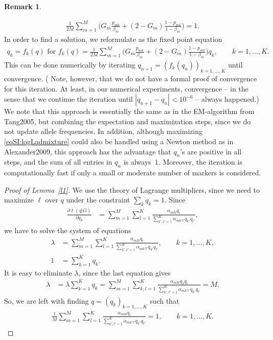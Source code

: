 \documentclass[12pt]{article}
\theoremstyle{definition}
\newtheorem{remark}{Remark}[section]
\begin{document}
\begin{remark}
\begin{enumerate}
\begin{align*}
      \frac{1}{2M} \sum_{m=1}^M \Big(G_m \frac{p_{mk}}{\beta_m} + (2-G_m)\frac{1-p_{mk}}{1-\beta_m}\Big) = 1.
    \end{align*}
    In order to find a solution, we reformulate as the fixed point
    equation
    \begin{align}\label{eqSI:fixed}
      q_k = f_k(q) \text{ for }f_k(q) =
      \frac{1}{2M} \sum_{m=1}^M \Big(G_m \frac{p_{mk}}{\beta_m} + (2-G_m)\frac{1-p_{mk}}{1-\beta_m}\Big)q_k,
      \qquad k =1,...,K.
    \end{align}
This can be done numerically by iterating
$q_{n+1} = (f_k(q_n))_{k=1,...,K}$ until convergence. ({\color{blue} Note, however, that we do not have a formal proof of convergence for this iteration. At least, in our numerical experiments, convergence  -- in the sense that we continue the iteration until $|q_{n+1} - q_n|< 10^{-6}$ -- always happened.}) We note that this approach is essentially the same as in the EM-algorithm from \cite{SI}{Tang2005}, but combining the expectation and maximization steps, since we do not update allele frequencies. In addition, although maximizing \eqref{eqSI:logLadmixture} could also be handled using a Newton method as in \cite{SI}{Alexander2009}, this approach has the advantage that $q_n$'s are positive in all steps, and the sum of all entries in $q_n$ is always~1. Moreover, the iteration is computationally fast if only a small or moderate number of {\color{blue} markers} is considered.

  \end{enumerate}
\end{remark}

\begin{proof}[Proof of Lemma~\ref{l1}]
  We use the theory of Lagrange multipliers, since we need to maximize
  $\ell$ over $q$ under the constraint $\sum_k q_k=1$.  Since
  \begin{align*}
    \frac{\partial \ell(q|G)}{\partial q_k} & = \sum_{m=1}^M \sum_{l=1}^K \frac{\alpha_{mkl}q_l}{\sum_{k',l'=1}^K
                                              \alpha_{mk'l'}q_{k'}q_{l'}},
  \end{align*}
  we have to solve the system of equations
  \begin{align*}
    \lambda & = \sum_{m=1}^M \sum_{l=1}^K \frac{\alpha_{mkl}q_l}{\sum_{k',l'=1}^K \alpha_{mk'l'}q_{k'}q_{l'}}, \qquad k=1,...,K,
    \\
    1 & = \sum_{k=1}^K q_k.
  \end{align*}
  It is easy to eliminate $\lambda$, since the last equation gives
  \begin{align*}
    \lambda & = \lambda \sum_{k=1}^K q_k = \sum_{m=1}^M \sum_{k,l=1}^K
              \frac{\alpha_{mkl}q_kq_l}{\sum_{k',l'=1}^K \alpha_{mk'l'}q_{k'}q_{l'}} = M.
  \end{align*}
  So, we are left with finding $q = (q_k)_{k=1,...,K}$ such that
  \begin{align*}
    \frac{1}{M}\sum_{m=1}^M \sum_{l=1}^K \frac{\alpha_{mkl}q_l}{\sum_{k',l'=1}^K \alpha_{mk'l'}q_{k'}q_{l'}} = 1, \qquad k=1,...,K.
  \end{align*}
\end{proof}
\end{document}
